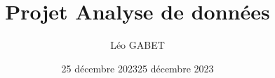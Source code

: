 \documentclass[french,]{compterendu}
\title{Projet Analyse de données}
\author{Léo GABET}
\date{25 décembre 2023}
\date{25 décembre 2023}
\theoremstyle{urcastyle}
\theoremstyle{remark}
\begin{document}

\newtheorem{lemme}{Lemme}[section]
\newtheorem{theoreme}{Théorème}[section]
\newtheorem{corollaire}{Corollaire}[section]
\newtheorem{propriete}{Propriété}[section]
\newtheorem{proprietes}{Propriétés}[section]



\maketitle

% 
% 
\end{document}

